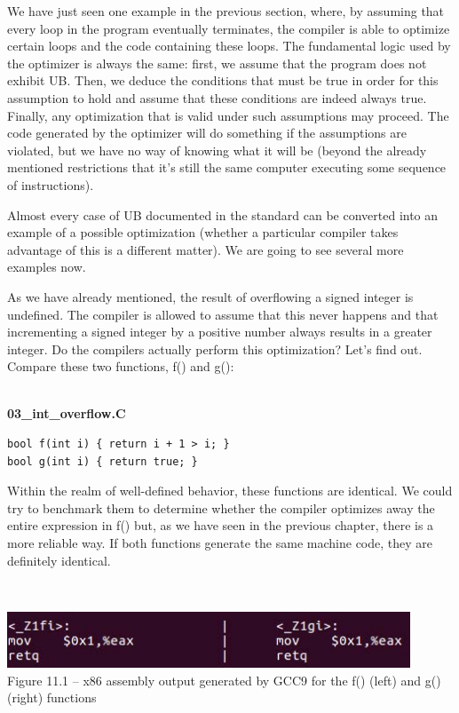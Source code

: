 We have just seen one example in the previous section, where, by assuming that every loop in the program eventually terminates, the compiler is able to optimize certain loops and the code containing these loops. The fundamental logic used by the optimizer is always the same: first, we assume that the program does not exhibit UB. Then, we deduce the conditions that must be true in order for this assumption to hold and assume that these conditions are indeed always true. Finally, any optimization that is valid under such assumptions may proceed. The code generated by the optimizer will do something if the assumptions are violated, but we have no way of knowing what it will be (beyond the already mentioned restrictions that it's still the same computer executing some sequence of instructions).

Almost every case of UB documented in the standard can be converted into an example of a possible optimization (whether a particular compiler takes advantage of this is a different matter). We are going to see several more examples now.

As we have already mentioned, the result of overflowing a signed integer is undefined. The compiler is allowed to assume that this never happens and that incrementing a signed integer by a positive number always results in a greater integer. Do the compilers actually perform this optimization? Let's find out. Compare these two functions, f() and g():

\hspace*{\fill} \\ %
\noindent
\textbf{03\_int\_overflow.C}
\begin{lstlisting}[style=styleCXX]
bool f(int i) { return i + 1 > i; }
bool g(int i) { return true; }
\end{lstlisting}

Within the realm of well-defined behavior, these functions are identical. We could try to benchmark them to determine whether the compiler optimizes away the entire expression in f() but, as we have seen in the previous chapter, there is a more reliable way. If both functions generate the same machine code, they are definitely identical. 

\hspace*{\fill} \\ %
\begin{center}
\includegraphics[width=0.9\textwidth]{content/3/chapter11/images/1.jpg}\\
Figure 11.1 – x86 assembly output generated by GCC9 for the f() (left) and g() (right) functions
\end{center}

